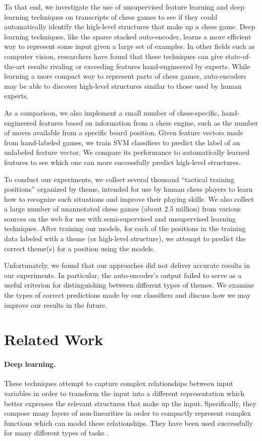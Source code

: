 \documentclass[11pt]{article}
\begin{document}
To that end, we investigate the use of unsupervised feature learning and deep learning techniques on transcripts of chess games to see if they could automatically identify the high-level structures that make up a chess game. Deep learning techniques, like the sparse stacked auto-encoder, learns a more efficient way to represent some input given a large set of examples. In other fields such as computer vision, researchers have found that these techniques can give state-of-the-art results rivaling or exceeding features hand-engineered by experts. While learning a more compact way to represent parts of chess games, auto-encoders may be able to discover high-level structures similar to those used by human experts.

As a comparison, we also implement a small number of chess-specific, hand-engineered features based on information from a chess engine, such as the number of moves available from a specific board position. Given feature vectors made from hand-labeled games, we train SVM classifiers to predict the label of an unlabeled feature vector. We compare its performance to automatically learned features to see which one can more successfully predict high-level structures.

To conduct our experiments, we collect several thousand ``tactical training positions'' organized by theme, intended for use by human chess players to learn how to recognize such situations and improve their playing skills. We also collect a large number of unannotated chess games (about 2.5 million) from various sources on the web for use with semi-supervised and unsupervised learning techniques. After training our models, for each of the positions in the training data labeled with a theme (or high-level structure), we attempt to predict the correct theme(s) for a position using the models.

Unfortunately, we found that our approaches did not deliver accurate results in our experiments. In particular, the auto-encoder's output failed to serve as a useful criterion for distinguishing between different types of themes. We examine the types of correct predictions made by our classifiers and discuss how we may improve our results in the future.

\section{Related Work}

\paragraph{Deep learning.} These techniques attempt to capture complex relationships between input variables in order to transform the input into a different representation which better expresses the relevant structures that make up the input. Specifically, they compose many layers of non-linearities in order to compactly represent complex functions which can model these relationships. They have been used successfully for many different types of tasks \cite{Vincent,Lee,Socher}.
\end{document}
